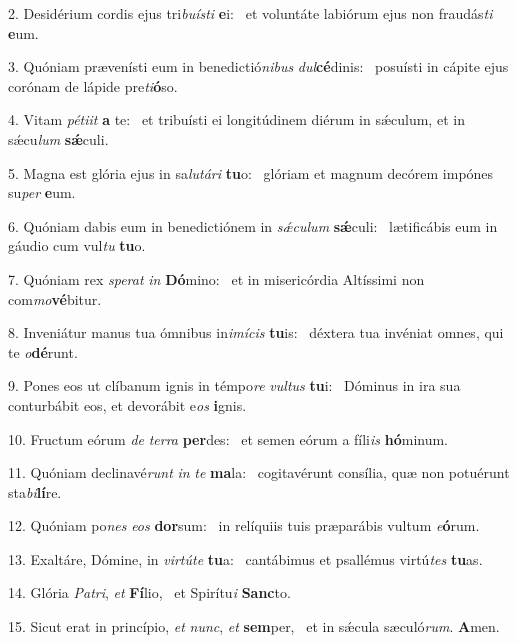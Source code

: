 2. Desidérium cordis ejus tri\textit{bu}\textit{ís}\textit{ti} \textbf{e}i: \ast\  et voluntáte labiórum ejus non fraudás\textit{ti} \textbf{e}um.\

3. Quóniam prævenísti eum in benedictió\textit{ni}\textit{bus} \textit{dul}\textbf{cé}dinis: \ast\  posuísti in cápite ejus corónam de lápide pre\textit{ti}\textbf{ó}so.\

4. Vitam \textit{pé}\textit{ti}\textit{it} \textbf{a} te: \ast\  et tribuísti ei longitúdinem diérum in sǽculum, et in sǽcu\textit{lum} \textbf{sǽ}culi.\

5. Magna est glória ejus in sa\textit{lu}\textit{tá}\textit{ri} \textbf{tu}o: \ast\  glóriam et magnum decórem impónes su\textit{per} \textbf{e}um.\

6. Quóniam dabis eum in benedictiónem in \textit{sǽ}\textit{cu}\textit{lum} \textbf{sǽ}culi: \ast\  lætificábis eum in gáudio cum vul\textit{tu} \textbf{tu}o.\

7. Quóniam rex \textit{spe}\textit{rat} \textit{in} \textbf{Dó}mino: \ast\  et in misericórdia Altíssimi non com\textit{mo}\textbf{vé}bitur.\

8. Inveniátur manus tua ómnibus in\textit{i}\textit{mí}\textit{cis} \textbf{tu}is: \ast\  déxtera tua invéniat omnes, qui te \textit{o}\textbf{dé}runt.\

9. Pones eos ut clíbanum ignis in témpo\textit{re} \textit{vul}\textit{tus} \textbf{tu}i: \ast\  Dóminus in ira sua conturbábit eos, et devorábit e\textit{os} \textbf{i}gnis.\

10. Fructum eórum \textit{de} \textit{ter}\textit{ra} \textbf{per}des: \ast\  et semen eórum a fíli\textit{is} \textbf{hó}minum.\

11. Quóniam declinavé\textit{runt} \textit{in} \textit{te} \textbf{ma}la: \ast\  cogitavérunt consília, quæ non potuérunt sta\textit{bi}\textbf{lí}re.\

12. Quóniam po\textit{nes} \textit{e}\textit{os} \textbf{dor}sum: \ast\  in relíquiis tuis præparábis vultum \textit{e}\textbf{ó}rum.\

13. Exaltáre, Dómine, in \textit{vir}\textit{tú}\textit{te} \textbf{tu}a: \ast\  cantábimus et psallémus virtú\textit{tes} \textbf{tu}as.\

14. Glória \textit{Pa}\textit{tri}, \textit{et} \textbf{Fí}lio, \ast\  et Spirítu\textit{i} \textbf{Sanc}to.\

15. Sicut erat in princípio, \textit{et} \textit{nunc}, \textit{et} \textbf{sem}per, \ast\  et in sǽcula sæculó\textit{rum}. \textbf{A}men.\

